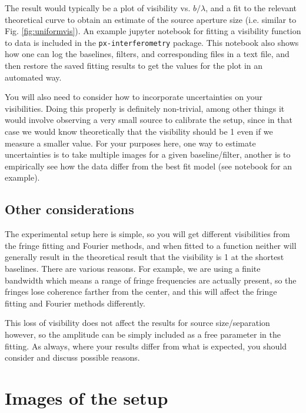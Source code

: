 \documentclass[11pt]{article}
\begin{document}
The result would typically be a plot of visibility vs. $b/\lambda$, and a fit to the relevant theoretical curve to obtain an estimate of the source aperture size (i.e. similar to Fig. \ref{fig:uniformvis}). An example jupyter notebook for fitting a visibility function to data is included in the \texttt{px-interferometry} package. This notebook also shows how one can log the baselines, filters, and corresponding files in a text file, and then restore the saved fitting results to get the values for the plot in an automated way.

You will also need to consider how to incorporate uncertainties on your visibilities. Doing this properly is definitely non-trivial, among other things it would involve observing a very small source to calibrate the setup, since in that case we would know theoretically that the visibility should be 1 even if we measure a smaller value. For your purposes here, one way to estimate uncertainties is to take multiple images for a given baseline/filter, another is to empirically see how the data differ from the best fit model (see notebook for an example).

\subsection{Other considerations}

The experimental setup here is simple, so you will get different visibilities from the fringe fitting and Fourier methods, and when fitted to a function neither will generally result in the theoretical result that the visibility is 1 at the shortest baselines. There are various reasons. For example, we are using a finite bandwidth which means a range of fringe frequencies are actually present, so the fringes lose coherence farther from the center, and this will affect the fringe fitting and Fourier methods differently.

This loss of visibility does not affect the results for source size/separation however, so the amplitude can be simply included as a free parameter in the fitting. As always, where your results differ from what is expected, you should consider and discuss possible reasons.

\clearpage
\appendix

\section{Images of the setup}
\end{document}
